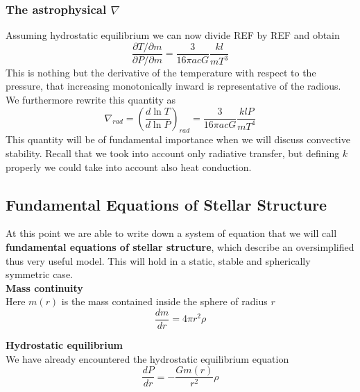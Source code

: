 \documentclass[11pt]{article}
\begin{document}
\subsubsection{The astrophysical $\nabla$}
Assuming hydrostatic equilibrium we can now divide REF by REF and obtain
\begin{equation}
	\frac{\partial T/\partial m}{\partial P / \partial m} = \frac{3}{16 \pi a c G} \frac{k l}{m T^3}
\end{equation}
This is nothing but the derivative of the temperature with respect to the pressure, that increasing monotonically inward is representative of the radious. We furthermore rewrite this quantity as
\begin{equation}\label{nablarad}
	\nabla_{rad} = \left( \frac{d \ln T}{d \ln P}  \right)_{rad}= \frac{3}{16 \pi a c G} \frac{k l P}{m T^4}
\end{equation}
This quantity will be of fundamental importance when we will discuss convective stability. Recall that we took into account only radiative transfer, but defining $k$ properly we could take into account also heat conduction.
\subsection{Fundamental Equations of Stellar Structure}
At this point we are able to write down a system of equation that we will call \textbf{fundamental equations of stellar structure}, which describe an oversimplified thus very useful model. This will hold in a static, stable and spherically symmetric case.\\

\textbf{Mass continuity} \\
Here $m(r)$ is the mass contained inside the sphere of radius $r$
\begin{equation}\label{masscons}
	\frac{dm}{dr}=4 \pi r^2 \rho
\end{equation}

\textbf{Hydrostatic equilibrium} \\
We have already encountered the hydrostatic equilibrium equation
\begin{equation}\label{hydroeq}
	\frac{dP}{dr}= - \frac{G m(r)}{r^2} \rho
\end{equation}
\end{document}
